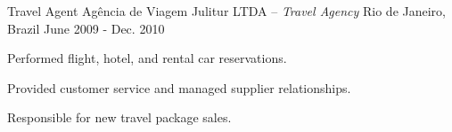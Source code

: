 \begin{cventries}
\cventry
{Travel Agent} %
{Agência de Viagem Julitur LTDA \textmd{-- \em{Travel Agency}}} %
{Rio de Janeiro, Brazil} %
{June 2009 - Dec. 2010} %
{ %
\begin{cvitems}
\item{Performed flight, hotel, and rental car reservations.}
\item{Provided customer service and managed supplier relationships.}
\item{Responsible for new travel package sales.}
\end{cvitems}
}


\end{cventries}